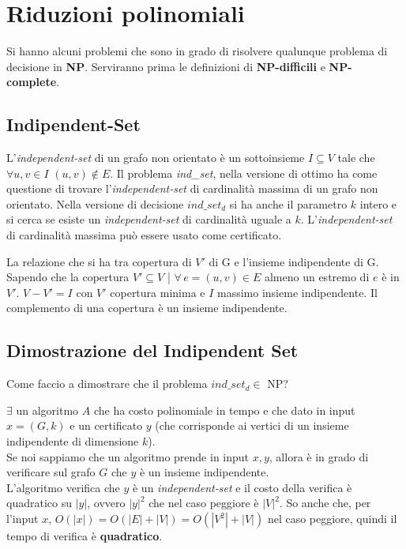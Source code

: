 \section{Riduzioni polinomiali}
Si hanno alcuni problemi che sono in grado di risolvere qualunque problema di decisione in \textbf{NP}. Serviranno prima le definizioni di \textbf{NP-difficili} e \textbf{NP-complete}.\\
\subsection{Indipendent-Set}
L'\textit{independent-set } di un grafo non orientato è un sottoinsieme $I\subseteq V$ tale che $\forall u,v\in I$ $(u,v)\notin E$. 
Il problema \textit{ind\_set}, nella versione di ottimo ha come questione di trovare l'\textit{independent-set} di cardinalità massima di un grafo non orientato. Nella versione di decisione $ind\_set_d$ si ha anche il parametro $k$ intero e si cerca se esiste un \textit{independent-set} di cardinalità uguale a $k$. L'\textit{independent-set} di cardinalità massima può essere usato come certificato.

La relazione che si ha tra copertura di $V'$ di G e l'insieme indipendente di G. Sapendo che la copertura $V' \subseteq V$ | $\forall \, e = (u,v) \in E$ almeno un estremo di $e$ è in $V'$. $V - V' = I$ con $V'$ copertura minima e $I$ massimo insieme indipendente. Il complemento di una copertura è un insieme indipendente.


\subsection{Dimostrazione del Indipendent Set}
Come faccio a dimostrare che il problema $ind\_set_d \in$ NP?

$\exists$ un algoritmo $A$ che ha costo polinomiale in tempo e che dato in input $x=(G,k)$ e un certificato $y$ (che corrisponde ai vertici di un insieme indipendente di dimensione $k$). \\ Se noi sappiamo che un algoritmo prende in input $x, y$, allora è in grado di verificare sul grafo $G$ che $y$ è un insieme indipendente. \\
L'algoritmo verifica che $y$ è un \textit{independent-set} e il costo della verifica è quadratico su $|y|$, ovvero $|y|^2$ che nel caso peggiore è $|V|^2$. So anche che, per l'input $x$, $O(|x|)=O(|E|+|V|)=O(|V^2|+|V|)$ nel caso peggiore, quindi il tempo di verifica è \textbf{quadratico}.

